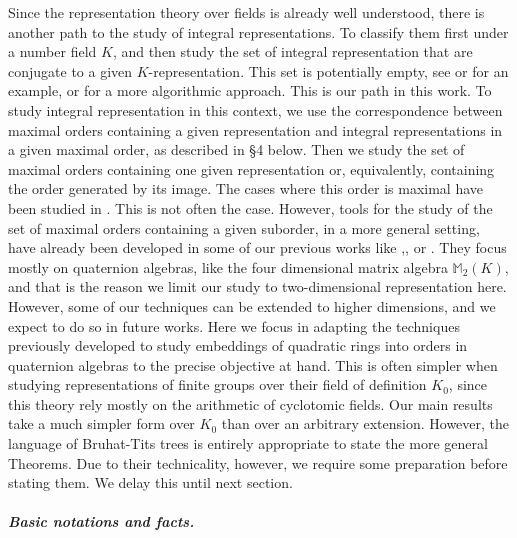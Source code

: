 \documentclass{article}
\theoremstyle{definition}
\theoremstyle{remark}
\begin{document}
Since the representation theory over fields is 
already well understood,
there is another path to the study of integral representations.
To classify them first under a number field $K$, and then study
the set of integral representation that are conjugate 
to a given
$K$-representation. This set is potentially empty, see
\cite{cli92} or \cite{Se08} for an example, 
or \cite{Hoff16} for a more
algorithmic approach. This is our path in this work. To study
integral representation in this context, 
we use the correspondence
between maximal orders containing a given representation
and integral representations in a given maximal 
order, as described in 
\S4 below. Then we study the set of maximal 
orders containing one given 
representation or, equivalently, 
containing the  order  generated by its image.
The cases where this order is maximal 
have been studied in \cite{Man18}.
This is not often the case. However, 
tools for the study of the set 
of maximal orders containing a given suborder, in a more 
general setting, have already been developed in 
some of our previous
works like \cite{A13},\cite{AS16},\cite{AAC18} or \cite{AB19}. 
They focus mostly on quaternion algebras, like the
four dimensional matrix algebra $\mathbb{M}_2(K)$,
and that is the reason we limit our
study to two-dimensional representation here. However, 
some of our techniques
can be extended to higher dimensions, and we expect to do so in
future works. Here we focus in adapting the techniques previously
developed to study embeddings of quadratic rings into orders
in quaternion algebras to the precise objective
at hand. This is often simpler when studying representations
of finite groups over their field of definition $K_0$, since 
this theory rely mostly on the arithmetic of cyclotomic fields. 
Our main results take a much simpler form over $K_0$ than over
an arbitrary extension. However, the language of Bruhat-Tits
trees is entirely appropriate to state the more general Theorems.
Due to their technicality, however,
we require some preparation before 
stating them. We delay this until next section.

\subparagraph{Basic notations and facts.}
\end{document}
